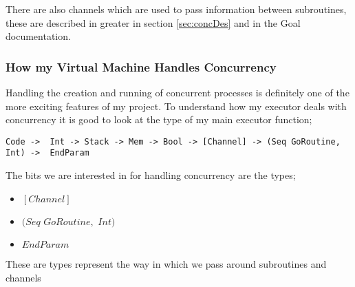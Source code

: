 There are also channels which are used to pass information between subroutines, these are described in greater in section \ref{sec:concDes} and in the Goal documentation.   

\subsubsection{How my Virtual Machine Handles Concurrency}

Handling the creation and running of concurrent processes is definitely one of the more exciting features of my project. To understand how my executor deals with concurrency it is good to look at the type of my main executor function;

\begin{lstlisting}
Code ->  Int -> Stack -> Mem -> Bool -> [Channel] -> (Seq GoRoutine, Int) ->  EndParam
\end{lstlisting}

The bits we are interested in for handling concurrency are the types;

\begin{itemize}
\item $[Channel]$
\item $(Seq$ $GoRoutine,$ $Int)$  %
\item $EndParam$
\end{itemize} 

These are types represent the way in which we pass around subroutines and channels 
